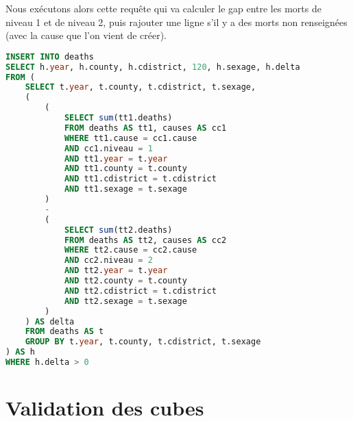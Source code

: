     Nous exécutons alors cette requête qui va calculer le gap entre les morts de niveau 1 et de niveau 2, puis rajouter une ligne
    s'il y a des morts non renseignées (avec la cause que l'on vient de créer).

    \begin{lstlisting}[frame=single, language=SQL]
INSERT INTO deaths
SELECT h.year, h.county, h.cdistrict, 120, h.sexage, h.delta
FROM (
    SELECT t.year, t.county, t.cdistrict, t.sexage,
    (
        (
            SELECT sum(tt1.deaths)
            FROM deaths AS tt1, causes AS cc1
            WHERE tt1.cause = cc1.cause
            AND cc1.niveau = 1
            AND tt1.year = t.year
            AND tt1.county = t.county
            AND tt1.cdistrict = t.cdistrict
            AND tt1.sexage = t.sexage
        )
        -
        (
            SELECT sum(tt2.deaths)
            FROM deaths AS tt2, causes AS cc2
            WHERE tt2.cause = cc2.cause
            AND cc2.niveau = 2
            AND tt2.year = t.year
            AND tt2.county = t.county
            AND tt2.cdistrict = t.cdistrict
            AND tt2.sexage = t.sexage
        )
    ) AS delta
    FROM deaths AS t
    GROUP BY t.year, t.county, t.cdistrict, t.sexage
) AS h
WHERE h.delta > 0
    \end{lstlisting}

\pagebreak


\chapter{Validation des cubes}

\pagebreak
